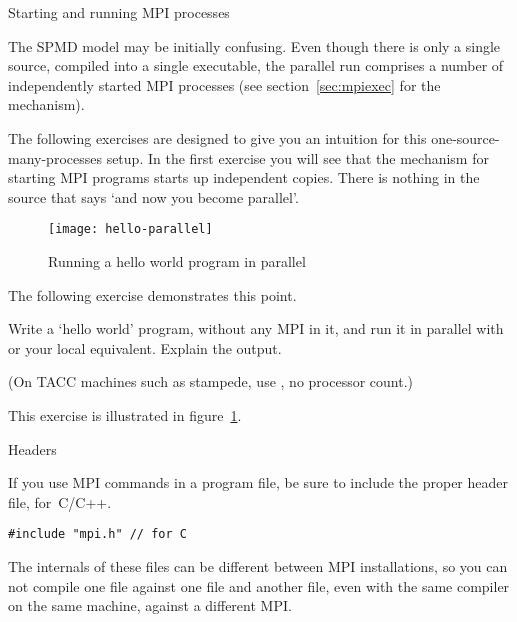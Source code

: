
 {Starting and running MPI processes}
\label{sec:mpi-start}

The \ac{SPMD} model may be initially confusing. Even though there is
only a single source, compiled into a single executable,
the parallel run comprises a number of independently started MPI
processes (see section~\ref{sec:mpiexec} for the mechanism).

The following exercises are designed to give you an intuition for this
one-source-many-processes setup. In the first exercise you will see
that the mechanism for starting MPI programs starts up independent
copies. There is nothing in the source that says `and now you become parallel'.

\begin{figure}[ht]
  \texttt{[image: hello-parallel]}
  \caption{Running a hello world program in parallel}
  \label{fig:hello-parallel}
\end{figure}

The following exercise demonstrates this point.


\begin{exercise}
  \label{ex:hello1}
  Write a `hello world' program, without any MPI in it,
  and run it in parallel with  or your local equivalent. 
  Explain the output.

\begin{tacc}
    (On TACC machines such as stampede, use , no
    processor count.)
\end{tacc}

\end{exercise}

This exercise is illustrated in figure~\ref{fig:hello-parallel}.

 {Headers}

If you use MPI commands in a program file, be sure to include
the proper header file,  for~C/C++.
\begin{verbatim}
#include "mpi.h" // for C
\end{verbatim}
The internals of these files can be different between MPI
installations, so you can not compile one file against one 
file and another file, even with the same compiler on the same machine,
against a different MPI.

